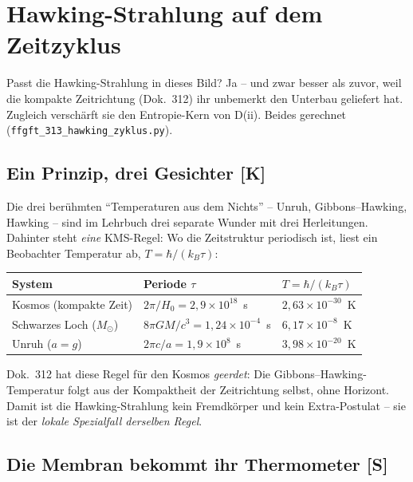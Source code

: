 \documentclass[11pt]{report}
\begin{document}
\chapter{Hawking-Strahlung auf dem Zeitzyklus}

Passt die Hawking-Strahlung in dieses Bild? Ja -- und zwar besser
als zuvor, weil die kompakte Zeitrichtung (Dok.~312) ihr unbemerkt
den Unterbau geliefert hat. Zugleich verschärft sie den
Entropie-Kern von D(ii). Beides gerechnet
(\texttt{ffgft\_313\_hawking\_zyklus.py}).

\section{Ein Prinzip, drei Gesichter [K]}

Die drei berühmten \enquote{Temperaturen aus dem Nichts} --
Unruh, Gibbons--Hawking, Hawking -- sind im Lehrbuch drei separate
Wunder mit drei Herleitungen. Dahinter steht \emph{eine}
KMS-Regel: Wo die Zeitstruktur periodisch ist, liest ein
Beobachter Temperatur ab, $T = \hbar/(k_B\tau)$:

\begin{center}
\begin{tabular}{lll}
\toprule
System & Periode $\tau$ & $T = \hbar/(k_B\tau)$ \\
\midrule
Kosmos (kompakte Zeit) & $2\pi/H_0 = 2{,}9\times10^{18}$~s &
  $2{,}63\times10^{-30}$~K \\
Schwarzes Loch ($M_\odot$) & $8\pi GM/c^3 = 1{,}24\times10^{-4}$~s &
  $6{,}17\times10^{-8}$~K \\
Unruh ($a = g$) & $2\pi c/a = 1{,}9\times10^{8}$~s &
  $3{,}98\times10^{-20}$~K \\
\bottomrule
\end{tabular}
\end{center}

Dok.~312 hat diese Regel für den Kosmos \emph{geerdet}: Die
Gibbons--Hawking-Temperatur folgt aus der Kompaktheit der
Zeitrichtung selbst, ohne Horizont. Damit ist die
Hawking-Strahlung kein Fremdkörper und kein Extra-Postulat -- sie
ist der \emph{lokale Spezialfall derselben Regel}.

\section{Die Membran bekommt ihr Thermometer [S]}
\end{document}
